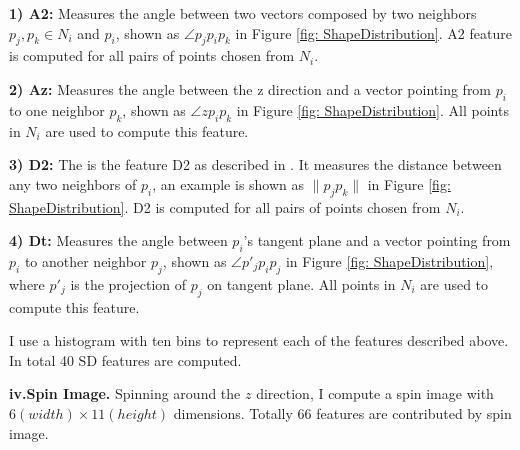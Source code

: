 \documentclass{iitthesis}
\begin{document}
\noindent \textbf{1) A2:} Measures the angle between two vectors composed by two neighbors $p_j, p_k\in N_i$ and $p_i$, shown as $\angle{p_j p_i p_k}$ in Figure \ref{fig: ShapeDistribution}. A2 feature is computed for all pairs of points chosen from $N_i$.

\noindent \textbf{2) Az:} Measures the angle between the z direction and a vector pointing from $p_i$ to one neighbor $p_k$, shown as $\angle{z p_i p_k}$ in Figure \ref{fig: ShapeDistribution}. All points in $N_i$ are used to compute this feature.

\noindent \textbf{3) D2:} The is the feature D2 as described in \cite{RO02}. It measures the distance between any two neighbors of $p_i$, an example is shown as $\|p_j p_k\|$ in Figure \ref{fig: ShapeDistribution}. D2 is computed for all pairs of points chosen from $N_i$.

\noindent \textbf{4) Dt:} Measures the angle between $p_i$'s tangent plane and a vector pointing from $p_i$ to another neighbor $p_j$, shown as $\angle{p'_j p_i p_j}$ in Figure \ref{fig: ShapeDistribution}, where $p'_j$ is the projection of $p_j$ on tangent plane. All points in $N_i$ are used to compute this feature.

I use a histogram with ten bins to represent each of the features described above. In total 40 SD features are computed.

\noindent\textbf{iv.\;Spin Image.}  
Spinning around the $z$ direction, I compute a spin image \cite{JA:99} with $6(width)\times 11(height)$ dimensions. Totally $66$ features are contributed by spin image.
\end{document}
